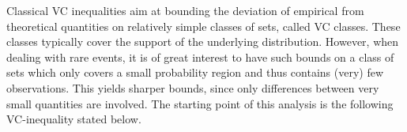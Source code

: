 %
%
%
Classical VC inequalities aim at bounding the deviation of empirical
from theoretical quantities on relatively simple classes of sets,
called VC classes. These classes typically cover the support of the
underlying distribution.  However, when dealing with rare
events, %
it is of great interest to have such bounds on a class of sets
which only covers a small probability region and thus contains (very)
few 
observations. This yields sharper
bounds,  %
 since only differences  between very small quantities are
involved. %
The starting point of this analysis is the following VC-inequality stated below.







